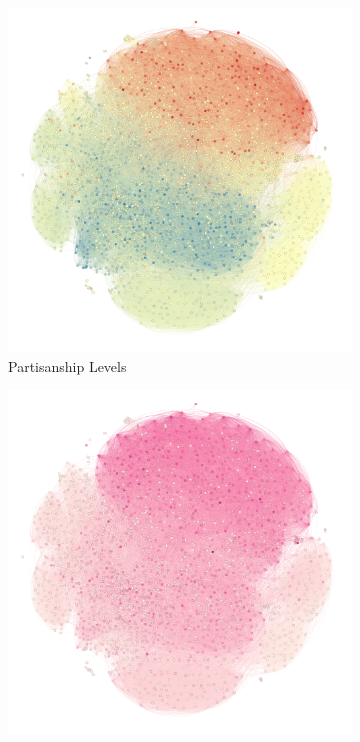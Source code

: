 \begin{figure}
\begin{subfigure}{.24\textwidth}
  \centering
  \includegraphics[width=1\linewidth]{figures/republican-democratic-graph.png}
  \caption{Partisanship Levels}
\label{fig:twitter-average-partisanship}
\end{subfigure}%
\begin{subfigure}{.24\textwidth}
  \centering
  \includegraphics[width=1\linewidth]{figures/partisan-variance-graph.png}

\end{subfigure}
\end{figure}
